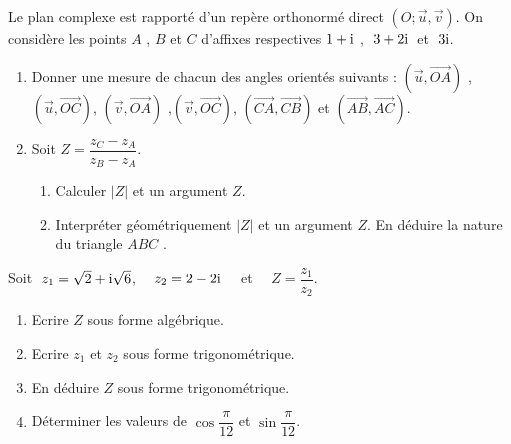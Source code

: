 \begin{exercice}
 Le plan complexe  est rapporté  d'un repère orthonormé direct  $ (O ;\overrightarrow{u},\overrightarrow{v}) $. 
On considère les points  $ A$  , $B $ et $  C $  d'affixes respectives $ 1 +\text{i}$  , $ \; 3+2\text{i}  \; $  \; et  \; $ \; 3\text{i}  $.
\begin{enumerate}
\item Donner une mesure de chacun des angles  orientés suivants :
  $ (\overrightarrow{u} , \overrightarrow{OA} )$ , $ (\overrightarrow{u} , \overrightarrow{OC} )$,  $ (\overrightarrow{v} , \overrightarrow{OA} )$ ,$ (\overrightarrow{v} , \overrightarrow{OC} )$, $ (\overrightarrow{CA} , \overrightarrow{CB} )$  et $ (\overrightarrow{AB}, \overrightarrow{AC} )$.
\item  Soit  $ Z = \dfrac{z_{C}-z_{A}}{z_{B}-z_{A}} $.
\begin{enumerate}
 \item Calculer  $  |Z| $ et un argument $ Z $. 
 \item Interpréter géométriquement $  |Z| $ et un argument $ Z $.
  En déduire la nature du triangle $ ABC $ . 
\end{enumerate} 
\end{enumerate} 
 \end{exercice}
\begin{exercice}
Soit  $\; z_1=\sqrt{2}+\text{i}\sqrt{6} $, $\quad z_2=2-2\text{i}\quad $  et   $\quad Z=\dfrac{z_1}{z_2} $.
    \begin{enumerate} 
   \item Ecrire $ Z $ sous forme algébrique.
  \item Ecrire  $z_1 $ et $ z_2 $  sous forme trigonométrique.
   \item En déduire  $ Z $ sous forme trigonométrique.
   \item Déterminer les valeurs de $\cos \dfrac{\pi}{12} $ et $\sin \dfrac{\pi}{12} $.
 \end{enumerate}
 
\end{exercice}


